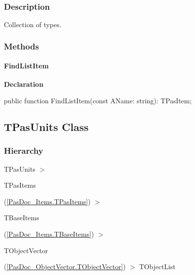 \documentclass{report}
\newif\ifpdf
\begin{document}
\subsubsection*{\large{\textbf{Description}}\normalsize\hspace{1ex}\hfill}
Collection of types.\subsubsection*{\large{\textbf{Methods}}\normalsize\hspace{1ex}\hfill}
\paragraph*{FindListItem}\hspace*{\fill}

\label{PasDoc_Items.TPasTypes-FindListItem}
\begin{list}{}{
\setlength{\itemindent}{0cm}
\setlength{\listparindent}{0cm}
\setlength{\leftmargin}{\evensidemargin}
\addtolength{\leftmargin}{\tmplength}
\settowidth{\labelsep}{X}
\addtolength{\leftmargin}{\labelsep}
\setlength{\labelwidth}{\tmplength}
}
\item[\textbf{Declaration}\hfill]
\ifpdf
\begin{flushleft}
\fi
\begin{ttfamily}
public function FindListItem(const AName: string): TPasItem;\end{ttfamily}

\ifpdf
\end{flushleft}
\fi

\end{list}
\ifpdf
\subsection*{\large{\textbf{TPasUnits Class}}\normalsize\hspace{1ex}\hrulefill}
\else
\subsection*{TPasUnits Class}
\fi
\label{PasDoc_Items.TPasUnits}
\subsubsection*{\large{\textbf{Hierarchy}}\normalsize\hspace{1ex}\hfill}
TPasUnits {$>$} \begin{ttfamily}TPasItems\end{ttfamily}(\ref{PasDoc_Items.TPasItems}) {$>$} \begin{ttfamily}TBaseItems\end{ttfamily}(\ref{PasDoc_Items.TBaseItems}) {$>$} \begin{ttfamily}TObjectVector\end{ttfamily}(\ref{PasDoc_ObjectVector.TObjectVector}) {$>$} 
TObjectList
\end{document}

